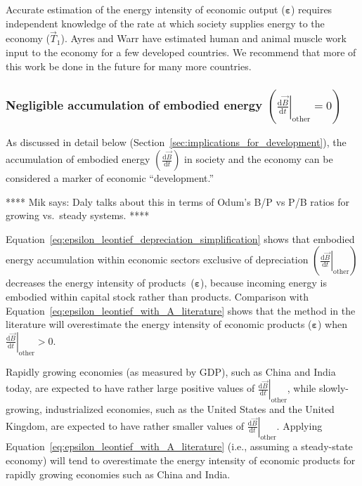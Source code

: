Accurate estimation of the energy intensity of economic output ($\bm{\varepsilon}$)
requires independent knowledge of the rate at which society supplies
energy to the economy ($\vec{T}_{1}$). 
Ayres and Warr have estimated human and animal muscle work
input to the economy for a few developed countries.\cite{Ayres:2010ug}
We recommend that more of this work be done 
in the future for many more countries.


\subsubsection{Negligible accumulation of embodied energy
$\left( \left. \frac{\mathrm{d}\vec{B}}{\mathrm{d}t} \right|_{\mathrm{other}} = 0 \right)$}

As discussed in detail below (Section~\ref{sec:implications_for_development}),
the accumulation of embodied energy 
$\left( \frac{\mathrm{d}\vec{B}}{\mathrm{d}t} \right)$ 
in society and the economy
can be considered a marker of economic ``development.''

**** 
Mik says: Daly talks about this in terms 
of Odum's B/P vs P/B ratios for growing vs.\ steady systems.
****

Equation~\ref{eq:epsilon_leontief_depreciation_simplification} 
shows that embodied energy accumulation within economic sectors 
exclusive of depreciation
$\left( \left. \frac{\mathrm{d}\vec{B}}{\mathrm{d}t} \right|_{\mathrm{other}} \right)$ 
decreases the energy intensity of products~($\bm{\varepsilon}$),
because incoming energy is embodied within capital stock rather than products.
Comparison with Equation~\ref{eq:epsilon_leontief_with_A_literature}
shows that the method in the literature will overestimate the energy intensity
of economic products ($\bm{\varepsilon}$) when 
$\left. \frac{\mathrm{d}\vec{B}}{\mathrm{d}t} \right|_{\mathrm{other}} > 0$.

Rapidly growing economies (as measured by GDP), such as China and India today,
are expected to have rather large positive values of 
$\left. \frac{\mathrm{d}\vec{B}}{\mathrm{d}t} \right|_{\mathrm{other}}$,
while slowly-growing, industrialized economies, 
such as the United States and the United Kingdom,
are expected to have rather smaller values of 
$\left. \frac{\mathrm{d}\vec{B}}{\mathrm{d}t} \right|_{\mathrm{other}}$.
Applying Equation~\ref{eq:epsilon_leontief_with_A_literature} 
(i.e., assuming a steady-state economy)
will tend to overestimate the energy intensity 
of economic products for rapidly growing economies such as China and India.

